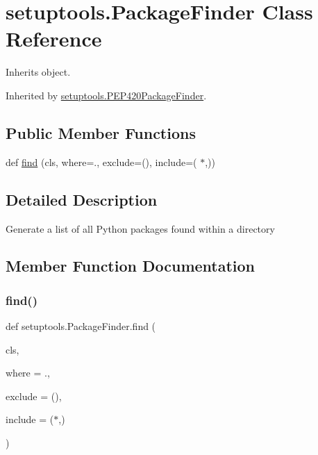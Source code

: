 \hypertarget{classsetuptools_1_1_package_finder}{}\section{setuptools.\+Package\+Finder Class Reference}
\label{classsetuptools_1_1_package_finder}


Inherits object.



Inherited by \hyperlink{classsetuptools_1_1_p_e_p420_package_finder}{setuptools.\+P\+E\+P420\+Package\+Finder}.

\subsection*{Public Member Functions}
\begin{DoxyCompactItemize}
\item 
def \hyperlink{classsetuptools_1_1_package_finder_a0ccdb7e47a8fbb515482bf3e6044e7ac}{find} (cls, where=\textquotesingle{}.\textquotesingle{}, exclude=(), include=(\textquotesingle{} $\ast$\textquotesingle{},))
\end{DoxyCompactItemize}


\subsection{Detailed Description}
\begin{DoxyVerb}Generate a list of all Python packages found within a directory
\end{DoxyVerb}
 

\subsection{Member Function Documentation}
\mbox{\label{classsetuptools_1_1_package_finder_a0ccdb7e47a8fbb515482bf3e6044e7ac}} 
\subsubsection{\texorpdfstring{find()}{find()}}
{\footnotesize\ttfamily def setuptools.\+Package\+Finder.\+find (\begin{DoxyParamCaption}\item[{}]{cls,  }\item[{}]{where = {\ttfamily \textquotesingle{}.\textquotesingle{}},  }\item[{}]{exclude = {\ttfamily ()},  }\item[{}]{include = {\ttfamily (\textquotesingle{}$\ast$\textquotesingle{},)} }\end{DoxyParamCaption})}

